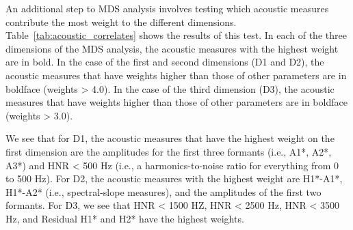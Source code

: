 An additional step to MDS analysis involves testing which acoustic measures contribute the most weight to the different dimensions. Table~\ref{tab:acoustic_correlates} shows the results of this test. In each of the three dimensions of the MDS analysis, the acoustic measures with the highest weight are in bold. In the case of the first and second dimensions (D1 and D2), the acoustic measures that have weights higher than those of other parameters are in boldface (weights > 4.0). In the case of the third dimension (D3), the acoustic measures that have weights higher than those of other parameters are in boldface (weights > 3.0). 

We see that for D1, the acoustic measures that have the highest weight on the first dimension are the amplitudes for the first three formants (i.e., A1*, A2*, A3*) and HNR < 500 Hz (i.e., a harmonics-to-noise ratio for everything from 0 to 500 Hz). For D2, the acoustic measures with the highest weight are H1*-A1*, H1*-A2* (i.e., spectral-slope measures), and the amplitudes of the first two formants. For D3, we see that HNR < 1500 HZ, HNR < 2500 Hz, HNR < 3500 Hz, and Residual H1* and H2* have the highest weights.


